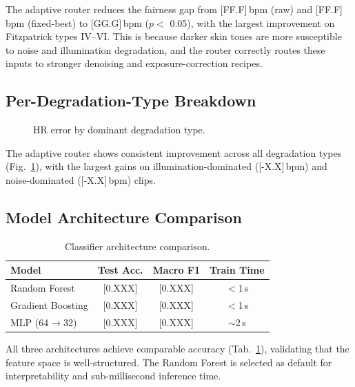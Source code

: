 \documentclass[conference]{IEEEtran}
\begin{document}
The adaptive router reduces the fairness gap from [FF.F]\,bpm (raw) and [FF.F]\,bpm (fixed-best) to [GG.G]\,bpm ($p <$ 0.05), with the largest improvement on Fitzpatrick types IV--VI. This is because darker skin tones are more susceptible to noise and illumination degradation, and the router correctly routes these inputs to stronger denoising and exposure-correction recipes.

\subsection{Per-Degradation-Type Breakdown}
\label{subsec:per_deg}

\begin{figure}[t]
\centering
{}
\caption{HR error by dominant degradation type.}
\label{fig:per_deg}
\end{figure}

The adaptive router shows consistent improvement across all degradation types (Fig.~\ref{fig:per_deg}), with the largest gains on illumination-dominated ([-X.X]\,bpm) and noise-dominated ([-X.X]\,bpm) clips.

\subsection{Model Architecture Comparison}
\label{subsec:model_comp}

\begin{table}[t]
\centering
\caption{Classifier architecture comparison.}
\label{tab:model_comp}
\begin{tabular}{@{}lccc@{}}
\toprule
Model & Test Acc. & Macro F1 & Train Time \\
\midrule
Random Forest & [0.XXX] & [0.XXX] & $<$1\,s \\
Gradient Boosting & [0.XXX] & [0.XXX] & $<$1\,s \\
MLP (64$\rightarrow$32) & [0.XXX] & [0.XXX] & $\sim$2\,s \\
\bottomrule
\end{tabular}
\end{table}

All three architectures achieve comparable accuracy (Tab.~\ref{tab:model_comp}), validating that the feature space is well-structured. The Random Forest is selected as default for interpretability and sub-millisecond inference time.
\end{document}
